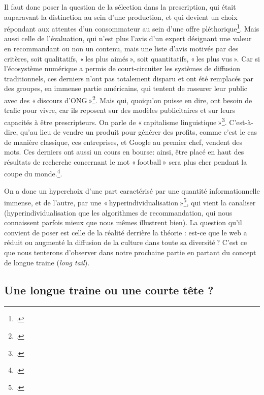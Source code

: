 Il faut donc poser la question de la sélection dans la prescription, qui était auparavant la distinction au sein d’une production, et qui devient un choix répondant aux attentes d’un consommateur au sein d’une offre pléthorique\footcite{ertzscheid2023}. Mais aussi celle de l’évaluation, qui n’est plus l’avis d’un expert désignant une valeur en recommandant ou non un contenu, mais une liste d’avis motivés par des critères, soit qualitatifs, « les plus aimés », soit quantitatifs, « les plus vus ». Car si l’écosystème numérique a permis de court-circuiter les systèmes de diffusion traditionnels, ces derniers n’ont pas totalement disparu et ont été remplacés par des groupes, en immense partie américains, qui tentent de rassurer leur public avec des « discours d’ONG »\footcite[p. 3]{laugee__2013}. Mais qui, quoiqu’on puisse en dire, ont besoin de trafic pour vivre, car ils reposent sur des modèles publicitaires et sur leurs capacités à être prescripteurs. On parle de « capitalisme linguistique »\footcite{kaplan_quand_2011}. C’est-à-dire, qu’au lieu de vendre un produit pour générer des profits, comme c’est le cas de manière classique, ces entreprises, et Google au premier chef, vendent des mots. Ces derniers ont aussi un cours en bourse: ainsi, être placé en haut des résultats de recherche concernant le mot « football » sera plus cher pendant la coupe du monde.\footcite{kaplan_quand_2011}.

On a donc un hyperchoix d’une part caractérisé par une quantité informationnelle immense, et de l’autre, par une « hyperindividualisation »\footcite[p. 3]{laugee__2013}, qui vient la canaliser (hyperindividualisation que les algorithmes de recommandation, qui nous connaissent parfois mieux que nous mêmes illustrent bien). La question qu’il convient de poser est celle de la réalité derrière la théorie : est-ce que le web a réduit ou augmenté la diffusion de la culture dans toute sa diversité ? C’est ce que nous tenterons d’observer dans notre prochaine partie en partant du concept de longue traine (\textit{long tail}).


\subsection{Une longue traine ou une courte tête ?}


